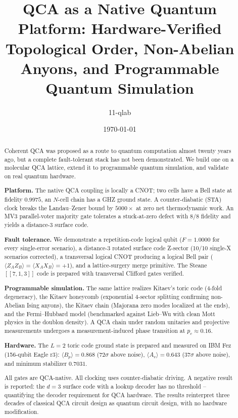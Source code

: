 \documentclass[11pt,aps,prl,twocolumn]{revtex4-2}
\begin{document}
\title{QCA as a Native Quantum Platform:
Hardware-Verified Topological Order,
Non-Abelian Anyons, and Programmable Quantum Simulation}

\author{11-qlab}

\date{\today}

\begin{abstract}
Coherent QCA was proposed as a route to quantum computation
almost twenty years ago, but a complete fault-tolerant stack
has not been demonstrated.  We build one on a molecular QCA
lattice, extend it to programmable quantum simulation, and
validate on real quantum hardware.

\textbf{Platform.}  The native QCA coupling is locally a
CNOT; two cells have a Bell state at fidelity $0.9975$, an
$N$-cell chain has a GHZ ground state.  A counter-diabatic
(STA) clock breaks the Landau--Zener bound by $5000\times$
at zero net thermodynamic work.  An MV3 parallel-voter
majority gate tolerates a stuck-at-zero defect with $8/8$
fidelity and yields a distance-3 surface code.

\textbf{Fault tolerance.}  We demonstrate a repetition-code
logical qubit ($F = 1.0000$ for every single-error scenario),
a distance-3 rotated surface code Z-sector (10/10 single-X
scenarios corrected), a transversal logical CNOT producing a
logical Bell pair ($\langle Z_A Z_B\rangle = \langle X_A X_B\rangle
= +1$), and a lattice-surgery merge primitive.  The Steane
$[[7,1,3]]$ code is prepared with transversal Clifford gates
verified.

\textbf{Programmable simulation.}  The same lattice realizes
Kitaev's toric code ($4$-fold degeneracy), the Kitaev
honeycomb (exponential $4$-sector splitting confirming
non-Abelian Ising anyons), the Kitaev chain (Majorana zero
modes localized at the ends), and the Fermi--Hubbard model
(benchmarked against Lieb--Wu with clean Mott physics in the
doublon density).  A QCA chain under random unitaries and
projective measurements undergoes a measurement-induced phase
transition at $p_c \approx 0.16$.

\textbf{Hardware.}  The $L=2$ toric code ground state is
prepared and measured on IBM Fez (156-qubit Eagle r3):
$\langle B_p\rangle = 0.868$ ($72\sigma$ above noise),
$\langle A_v\rangle = 0.643$ ($37\sigma$ above noise), and
minimum stabilizer $0.7031$.

All gates are QCA-native.  All clocking uses counter-diabatic
driving.  A negative result is reported: the $d=3$ surface
code with a lookup decoder has no threshold -- quantifying
the decoder requirement for QCA hardware.  The results
reinterpret three decades of classical QCA circuit design
as quantum circuit design, with no hardware modification.
\end{abstract}
\end{document}
